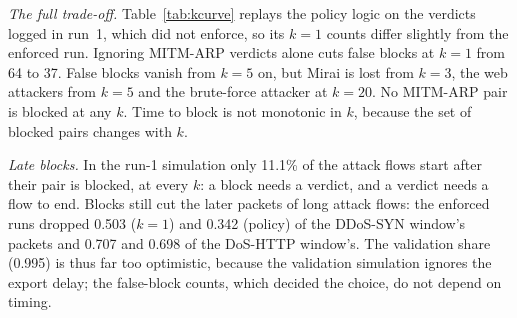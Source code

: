 \emph{The full trade-off.} Table~\ref{tab:kcurve} replays the policy logic on the verdicts logged in run~1, which did not enforce, so its $k=1$ counts differ slightly from the enforced run. Ignoring MITM-ARP verdicts alone cuts false blocks at $k=1$ from 64 to 37. False blocks vanish from $k=5$ on, but Mirai is lost from $k=3$, the web attackers from $k=5$ and the brute-force attacker at $k=20$. No MITM-ARP pair is blocked at any $k$. Time to block is not monotonic in $k$, because the set of blocked pairs changes with $k$.

\emph{Late blocks.} In the run-1 simulation only 11.1\% of the attack flows start after their pair is blocked, at every $k$: a block needs a verdict, and a verdict needs a flow to end. Blocks still cut the later packets of long attack flows: the enforced runs dropped 0.503 ($k=1$) and 0.342 (policy) of the DDoS-SYN window's packets and 0.707 and 0.698 of the DoS-HTTP window's. The validation share (0.995) is thus far too optimistic, because the validation simulation ignores the export delay; the false-block counts, which decided the choice, do not depend on timing.
